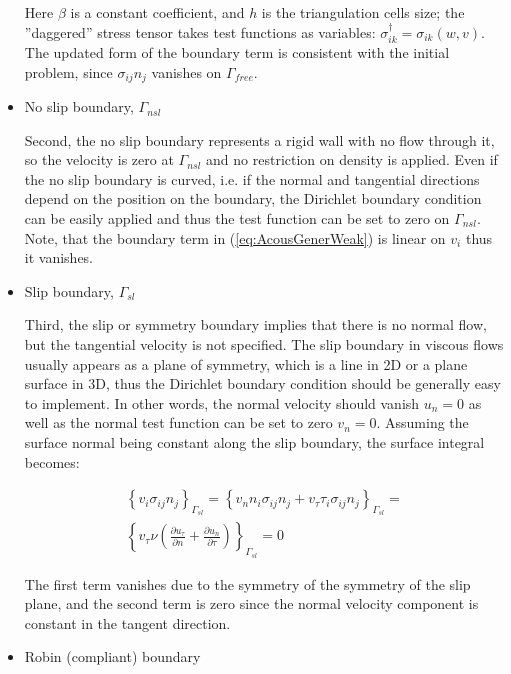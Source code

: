 \begin{itemize}
  Here $\beta$ is a constant coefficient, and $h$ is the triangulation cells size; the ''daggered'' stress tensor takes test functions as variables: $\sigma_{ik}^\dagger = \sigma_{ik} (w, v)$. The updated form of the boundary term is consistent with the initial problem, since $\sigma_{ij} n_j$ vanishes on ${\Gamma_{free}}$.
  
  \item No slip boundary, $\Gamma_{nsl}$
  
  Second, the no slip boundary represents a rigid wall with no flow through it, so the velocity is zero at $\Gamma_{nsl}$ and no restriction on density is applied. Even if the no slip boundary is curved, i.e. if the normal and tangential directions depend on the position on the boundary, the Dirichlet boundary condition can be easily applied and thus the test function can be set to zero on $\Gamma_{nsl}$. Note, that the boundary term in (\ref{eq:AcousGenerWeak}) is linear on $v_i$ thus it vanishes. 
  
  \item Slip boundary, $\Gamma_{sl}$
  
  Third, the slip or symmetry boundary implies that there is no normal flow, but the tangential velocity is not specified. The slip boundary in viscous flows usually appears as a plane of symmetry, which is a line in 2D or a plane surface in 3D, thus the Dirichlet boundary condition should be generally easy to implement. In other words, the normal velocity should vanish $u_n = 0$ as well as the normal test function can be set to zero $v_n = 0$. Assuming the surface normal being constant along the slip boundary, the surface integral becomes:
  
  \begin{equation}
  \begin{aligned}
  \left\{ v_i\sigma_{ij} n_j \right\}_{\Gamma_{sl}} =   \left\{ v_n n_i \sigma_{ij} n_j + v_{\tau} \tau_i \sigma_{ij} n_j \right\}_{\Gamma_{sl}} = \\ 
  \left\{ v_{\tau} \nu \left( \frac{\partial u_{\tau}}{\partial n} + \frac{\partial u_n}{\partial \tau} \right)  \right\}_{\Gamma_{sl}} = 0
  \end{aligned}
  \end{equation}
  
  The first term vanishes due to the symmetry of the symmetry of the slip plane, and the second term is zero since the normal velocity component is constant in the tangent direction.
  
  \item Robin (compliant) boundary
  

\end{itemize}

